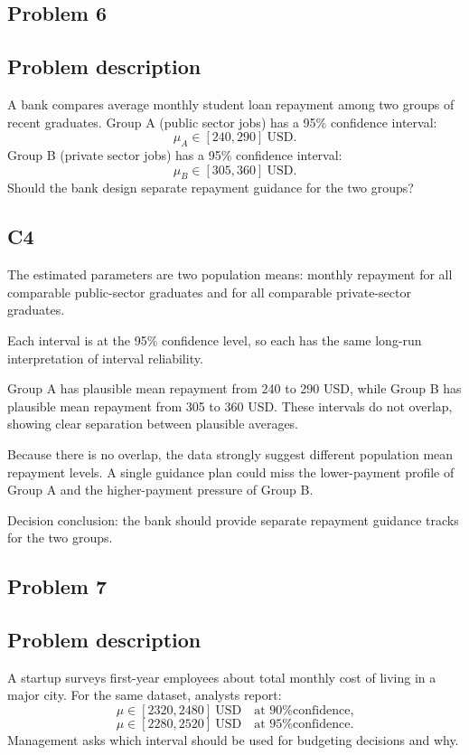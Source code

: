 \begin{ExamProblems}
		\newpage
		\item
		\subsection*{Problem 6}
		\subsection*{Problem description}
		A bank compares average monthly student loan repayment among two groups of recent graduates.
		Group A (public sector jobs) has a 95\% confidence interval:
		\[
		\mu_A \in [240, 290]\ \text{USD}.
		\]
		Group B (private sector jobs) has a 95\% confidence interval:
		\[
		\mu_B \in [305, 360]\ \text{USD}.
		\]
		Should the bank design separate repayment guidance for the two groups?

		\subsection*{C4}
		The estimated parameters are two population means: monthly repayment for all comparable public-sector graduates and for all comparable private-sector graduates.

		Each interval is at the 95\% confidence level, so each has the same long-run interpretation of interval reliability.

		Group A has plausible mean repayment from 240 to 290 USD, while Group B has plausible mean repayment from 305 to 360 USD.
		These intervals do not overlap, showing clear separation between plausible averages.

		Because there is no overlap, the data strongly suggest different population mean repayment levels.
		A single guidance plan could miss the lower-payment profile of Group A and the higher-payment pressure of Group B.

		Decision conclusion: the bank should provide separate repayment guidance tracks for the two groups.

		\newpage
		\item
		\subsection*{Problem 7}
		\subsection*{Problem description}
		A startup surveys first-year employees about total monthly cost of living in a major city.
		For the same dataset, analysts report:
		\[
		\mu \in [2320, 2480]\ \text{USD} \quad \text{at 90\% confidence,}
		\]
		\[
		\mu \in [2280, 2520]\ \text{USD} \quad \text{at 95\% confidence.}
		\]
		Management asks which interval should be used for budgeting decisions and why.


\end{ExamProblems}
